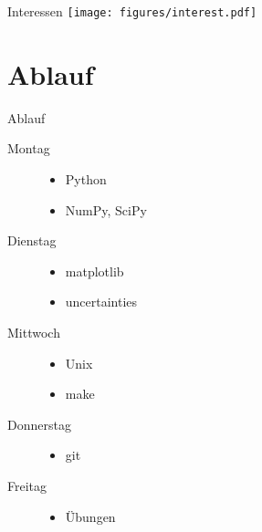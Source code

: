 \begin{frame}{Interessen}
  \centering
  \texttt{[image: figures/interest.pdf]}
\end{frame}

\section{Ablauf}

\begin{frame}{Ablauf}
  \begin{description}
    \item[Montag]
      \begin{itemize}
        \item Python
        \item NumPy, SciPy
      \end{itemize}
    \item[Dienstag]
      \begin{itemize}
        \item matplotlib
        \item uncertainties
      \end{itemize}
    \item[Mittwoch]
      \begin{itemize}
        \item Unix
        \item make
      \end{itemize}
    \item[Donnerstag]
      \begin{itemize}
        \item git
      \end{itemize}
    \item[Freitag]
      \begin{itemize}
        \item Übungen
      \end{itemize}
  \end{description}
\end{frame}
